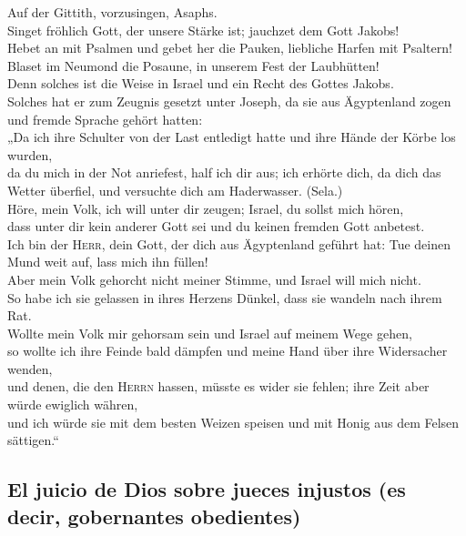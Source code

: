 Auf der Gittith, vorzusingen, Asaphs.\\
 Singet fröhlich Gott, der unsere Stärke ist; jauchzet dem
Gott Jakobs!\\
 Hebet an mit Psalmen und gebet her die Pauken, liebliche
Harfen mit Psaltern!\\
 Blaset im Neumond die Posaune, in unserem Fest der
Laubhütten!\\
 Denn solches ist die Weise in Israel und ein Recht des
Gottes Jakobs.\\
 Solches hat er zum Zeugnis gesetzt unter Joseph, da sie
aus Ägyptenland zogen und fremde Sprache gehört hatten:\\
 „Da ich ihre Schulter von der Last entledigt hatte und
ihre Hände der Körbe los wurden,\\
 da du mich in der Not anriefest, half ich dir aus; ich
erhörte dich, da dich das Wetter überfiel, und versuchte dich am
Haderwasser. (Sela.)\\
 Höre, mein Volk, ich will unter dir zeugen; Israel, du
sollst mich hören,\\
 dass unter dir kein anderer Gott sei und du keinen
fremden Gott anbetest.\\
 Ich bin der \textsc{Herr}, dein Gott, der dich aus
Ägyptenland geführt hat: Tue deinen Mund weit auf, lass mich ihn
füllen!\\
 Aber mein Volk gehorcht nicht meiner Stimme, und Israel
will mich nicht.\\
 So habe ich sie gelassen in ihres Herzens Dünkel, dass
sie wandeln nach ihrem Rat.\\
 Wollte mein Volk mir gehorsam sein und Israel auf meinem
Wege gehen,\\
 so wollte ich ihre Feinde bald dämpfen und meine Hand
über ihre Widersacher wenden,\\
 und denen, die den \textsc{Herrn} hassen, müsste es
wider sie fehlen; ihre Zeit aber würde ewiglich währen,\\
 und ich würde sie mit dem besten Weizen speisen und mit
Honig aus dem Felsen sättigen.``

\hypertarget{el-juicio-de-dios-sobre-jueces-injustos-es-decir-gobernantes-obedientes}{%
\subsection{El juicio de Dios sobre jueces injustos (es decir,
gobernantes
obedientes)}\label{el-juicio-de-dios-sobre-jueces-injustos-es-decir-gobernantes-obedientes}}

